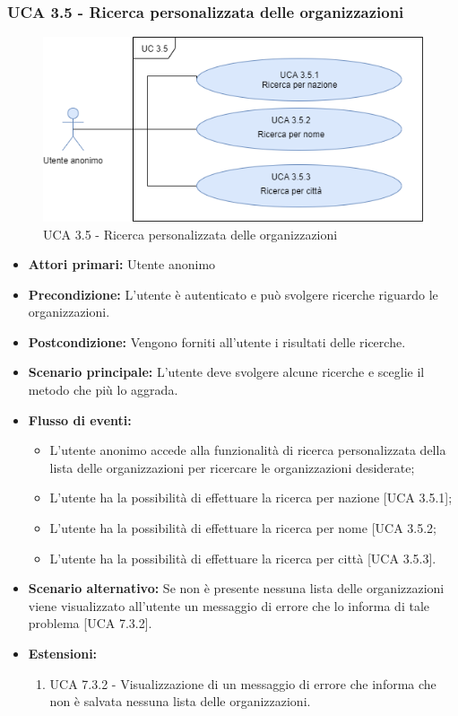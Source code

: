 \subsubsection{UCA 3.5 - Ricerca personalizzata delle organizzazioni}%
\begin{figure}[h]
	\centering
	
	\includegraphics[scale=0.5]{sezioni/UseCase/Immagini/UCA3.5.png}
	\caption{UCA 3.5 - Ricerca personalizzata delle organizzazioni}
\end{figure}
\begin{itemize}
	\item \textbf{Attori primari:} Utente anonimo
	\item \textbf{Precondizione:} L'utente è autenticato e può svolgere ricerche riguardo le organizzazioni.
	\item \textbf{Postcondizione:} Vengono forniti all'utente i risultati delle ricerche.
	\item \textbf{Scenario principale:} L'utente deve svolgere alcune ricerche e sceglie il metodo che più lo aggrada.
	\item \textbf{Flusso di eventi:} 
	\begin{itemize}
		\item L'utente anonimo accede alla funzionalità di ricerca personalizzata della lista delle organizzazioni per ricercare le organizzazioni desiderate;
		\item L'utente ha la possibilità di effettuare la ricerca per nazione [UCA 3.5.1];
		\item L'utente ha la possibilità di effettuare la ricerca per nome [UCA 3.5.2;
		\item L'utente ha la possibilità di effettuare la ricerca per città [UCA 3.5.3].
	\end{itemize}
	\item \textbf{Scenario alternativo:} Se non è presente nessuna lista delle organizzazioni viene visualizzato all'utente un messaggio di errore che lo informa di tale problema [UCA 7.3.2].
	\item \textbf{Estensioni:}
	\begin{enumerate}
		\item UCA 7.3.2 - Visualizzazione di un messaggio di errore che informa che non è salvata nessuna lista delle organizzazioni.
	\end{enumerate}
\end{itemize}

